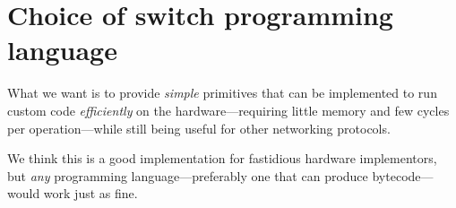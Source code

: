 \section{Choice of switch programming language}


What we want is to provide \textit{simple} primitives that can be
implemented to run custom code \textit{efficiently} on the
hardware---requiring little memory and few cycles per operation---while
still being useful for other networking protocols.

We think this is a good implementation for fastidious hardware implementors,
but \textit{any} programming language---preferably one that can produce
bytecode---would work just as fine.

